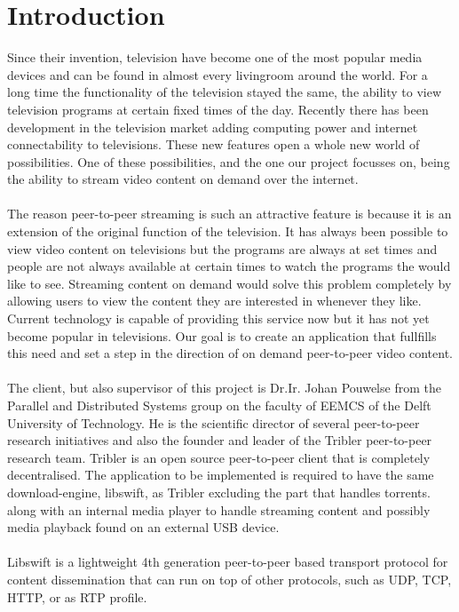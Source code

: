 \chapter{Introduction}
Since their invention, television have become one of the most popular media devices and can be found in almost every livingroom around the world. For a long time the functionality of the television stayed the same, the ability to view television programs at certain fixed times of the day. Recently there has been development in the television market adding computing power and internet connectability to televisions. These new features open a whole new world of possibilities. One of these possibilities, and the one our project focusses on, being the ability to stream video content on demand over the internet. 
\\\\
The reason peer-to-peer streaming is such an attractive feature is because it is an extension of the original function of the television. It has always been possible to view video content on televisions but the programs are always at set times and people are not always available at certain times to watch the programs the would like to see. Streaming content on demand would solve this problem completely by allowing users to view the content they are interested in whenever they like. Current technology is capable of providing this service now but it has not yet become popular in televisions. Our goal is to create an application that fullfills this need and set a step in the direction of on demand peer-to-peer video content.
\\\\
The client, but also supervisor of this project is Dr.Ir. Johan Pouwelse from the Parallel and Distributed Systems group on the faculty of EEMCS of the Delft University of Technology.
He is the scientific director of several peer-to-peer research initiatives and also the founder and leader of the Tribler peer-to-peer research team.
Tribler\cite{tribler} is an open source peer-to-peer client that is completely decentralised.
The application to be implemented is required to have the same download-engine, libswift,\cite{swift} as Tribler excluding the part that handles torrents.
along with an internal media player to handle streaming content and possibly media playback found on an external USB device.
\\\\
Libswift is a lightweight 4th generation peer-to-peer based transport protocol for content dissemination
that can run on top of other protocols, such as UDP, TCP, HTTP, or as RTP profile.
